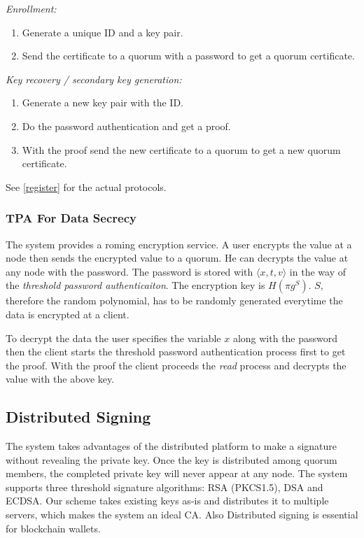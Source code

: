 \noindent
{\em Enrollment:}
\begin{enumerate}
\item Generate a unique ID and a key pair.
\item Send the certificate to a quorum with a password to get a
  quorum certificate.
\end{enumerate}

\noindent
{\em Key recovery / secondary key generation:}
\begin{enumerate}
\item Generate a new key pair with the ID.
\item Do the password authentication and get a proof.
\item With the proof send the new certificate to a quorum to get a new
  quorum certificate.
\end{enumerate}
See \ref{register} for the actual protocols.

\subsubsection*{TPA For Data Secrecy}
The system provides a roming encryption service. A user encrypts
the value at a node then sends the encrypted value to a quorum. He can
decrypts the value at any node with the password. The password is
stored with $\langle x, t, v \rangle$ in the way of the {\em threshold
password authenticaiton}. The encryption key is $H(\pi g^S)$. $S$,
therefore the random polynomial, has to be randomly generated
everytime the data is encrypted at a client.

To decrypt the data the user specifies the variable $x$ along with the
password then the client starts the threshold password authentication
process first to get the proof. With the proof the client proceeds the
{\em read} process and decrypts the value with the above key.

\subsection{Distributed Signing}
The system takes advantages of the distributed platform to make a
signature without revealing the private key. Once the key is
distributed among quorum members, the completed private key will never
appear at any node. The system supports three threshold signature
algorithms: RSA (PKCS1.5), DSA and ECDSA. Our scheme takes existing
keys as-is and distributes it to multiple servers, which makes the
system an ideal CA. Also Distributed signing is essential for
blockchain wallets.

